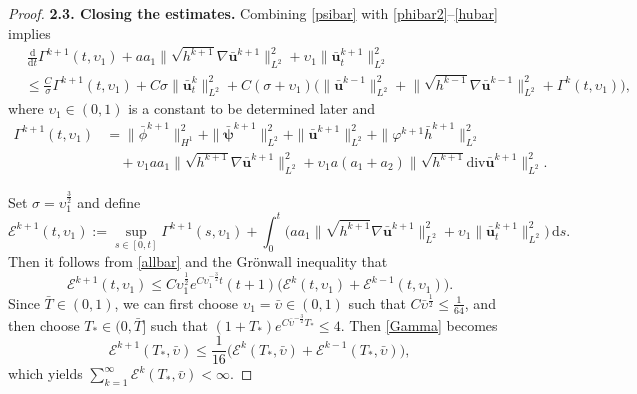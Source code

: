 \documentclass[11pt,reqno]{amsart}
\numberwithin{rk}{section}
\numberwithin{prop}{section}
\numberwithin{mydef}{section}
\numberwithin{lem}{section}
\numberwithin{equation}{section}
\numberwithin{thm}{section}
\begin{document}
\begin{proof}
\textbf{2.3. Closing the estimates.} Combining \eqref{psibar} with \eqref{phibar2}--\eqref{hubar} implies 
\begin{equation}\label{allbar}
\begin{aligned}
&\,\frac{\mathrm{d}}{\mathrm{d}t}\varGamma^{k+1}(t,\upsilon_1) +a a_1\|\sqrt{h^{k+1}}\nabla\bar{\boldsymbol{u}}^{k+1}\|^2_{L^2}+\upsilon_1\|\bar{\boldsymbol{u}}_t^{k+1}\|^2_{L^2}\\
&\leq \frac{C}{\sigma}\varGamma^{k+1}(t,\upsilon_1) \!+\!C\sigma\|\bar{\boldsymbol{u}}^k_t\|_{L^2}^2\! +\!C(\sigma+\upsilon_1)\big(\|\bar{\boldsymbol{u}}^{k-1}\|^2_{L^2}\!+\!\|\sqrt{h^{k-1}}\nabla\bar{\boldsymbol{u}}^{k-1}\|^2_{L^2}\!+\!\varGamma^{k}(t,\upsilon_1)\big),
\end{aligned}
\end{equation}
where $\upsilon_1\in (0,1)$ is a constant to be determined later and
\begin{equation*}
\begin{aligned}
\varGamma^{k+1}(t,\upsilon_1)&=  \|\bar\phi^{k+1}\|_{H^1}^2+ \|\bar{\boldsymbol{\psi}}^{k+1}\|_{L^2}^2+ \|\bar{\boldsymbol{u}}^{k+1}\|_{L^2}^2+\|\varphi^{k+1}\bar{h}^{k+1}\|^2_{L^2}\\
&\quad+\upsilon_1 a a_1\|\sqrt{h^{k+1}}\nabla\bar{\boldsymbol{u}}^{k+1}\|^2_{L^2}
+\upsilon_1 a(a_1+a_2)\|\sqrt{h^{k+1}}\mathrm{div}\bar{\boldsymbol{u}}^{k+1}\|^2_{L^2}.
\end{aligned}
\end{equation*}

Set $\sigma=\upsilon_1^{\frac{3}{2}}$ and define
\begin{equation*}
\mathcal{E}^{k+1}(t,\upsilon_1):=\sup_{s\in [0,t]}\varGamma^{k+1}(s,\upsilon_1)+\int^t_0\big(aa_1\|\sqrt{h^{k+1}}\nabla\bar{\boldsymbol{u}}^{k+1}\|^2_{L^2}+\upsilon_1\|\bar{\boldsymbol{u}}^{k+1}_t\|^2_{L^2}\big)\,\mathrm{d}s.
\end{equation*}
Then it follows from \eqref{allbar}  and the Gr\"onwall inequality  that 
\begin{equation}\label{Gamma}
\mathcal{E}^{k+1}(t,\upsilon_1)\leq C\upsilon^{\frac{1}{2}}_1 e^{C\upsilon_1^{-\frac{3}{2}}t}(t+1)\big(\mathcal{E}^{k}(t,\upsilon_1)+\mathcal{E}^{k-1}(t,\upsilon_1)\big).
\end{equation}
Since $\bar{T}\in (0,1)$, we can first choose   $\upsilon_1=\bar{\upsilon}\in (0,1)$ such that
$C\bar{\upsilon}^{\frac{1}{2}}\leq \frac{1}{64}$, and then choose  $T_*\in (0,\bar{T}]$ such that
$(1+T_*)e^{C\bar{\upsilon}^{-\frac{3}{2}}T_*}\leq 4$. Then \eqref{Gamma} becomes
\begin{equation*}
\mathcal{E}^{k+1}(T_*,\bar\upsilon)\leq \frac{1}{16}\big(\mathcal{E}^{k}(T_*,\bar\upsilon)+\mathcal{E}^{k-1}(T_*,\bar\upsilon)\big),    
\end{equation*}
which yields $\sum_{k=1}^{\infty}\mathcal{E}^{k}(T_*,\bar\upsilon)<\infty$.




\end{proof}
\end{document}
